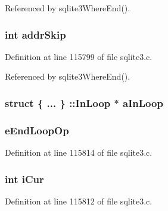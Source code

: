 Referenced by sqlite3\+Where\+End().

\hypertarget{struct_where_level_a9f619c343c9098910c3b4aad6b570171}{}
\subsubsection[{addr\+Skip}]{\setlength{\rightskip}{0pt plus 5cm}int addr\+Skip}\label{struct_where_level_a9f619c343c9098910c3b4aad6b570171}


Definition at line 115799 of file sqlite3.\+c.



Referenced by sqlite3\+Where\+End().

\hypertarget{struct_where_level_ae0cc3758f11e91d94000fc81e2b6ccea}{}
\subsubsection[{a\+In\+Loop}]{\setlength{\rightskip}{0pt plus 5cm}struct \{ ... \} \+::In\+Loop $\ast$ a\+In\+Loop}\label{struct_where_level_ae0cc3758f11e91d94000fc81e2b6ccea}
\hypertarget{struct_where_level_a8ef3a5e578750b0362269451c8ff61fa}{}
\subsubsection[{e\+End\+Loop\+Op}]{ e\+End\+Loop\+Op}\label{struct_where_level_a8ef3a5e578750b0362269451c8ff61fa}


Definition at line 115814 of file sqlite3.\+c.

\hypertarget{struct_where_level_ad4234df4b7f768520fbd6a92a2b0023c}{}
\subsubsection[{i\+Cur}]{\setlength{\rightskip}{0pt plus 5cm}int i\+Cur}\label{struct_where_level_ad4234df4b7f768520fbd6a92a2b0023c}


Definition at line 115812 of file sqlite3.\+c.


